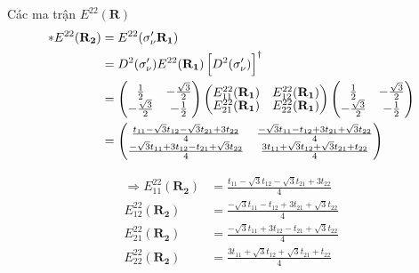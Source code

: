 \documentclass{report}
\begin{document}
Các ma trận $E^{22}(\mathbf{R})$
\begin{align*}
	\ast E^{22} (\mathbf{R_2})
	 & =  E^{22} (\sigma'_\nu \mathbf{R_1})                                             \\
	 & = D^2(\sigma'_\nu)  E^{22}(\mathbf{R_1}) \left[ D^2(\sigma'_\nu) \right]^\dagger \\
	 &
	=
	\begin{pmatrix}
		\renewcommand{\arraystretch}{0.72}
		\frac{1}{2}         & -\frac{\sqrt{3}}{2} \\
		-\frac{\sqrt{3}}{2} & -\frac{1}{2}
	\end{pmatrix}
	\begin{pmatrix}
		E_{11}^{22}(\mathbf{R_1}) & E_{12}^{22}(\mathbf{R_1}) \\
		E_{21}^{22}(\mathbf{R_1}) & E_{22}^{22}(\mathbf{R_1})
	\end{pmatrix}
	\begin{pmatrix}
		\frac{1}{2}         & -\frac{\sqrt{3}}{2} \\
		-\frac{\sqrt{3}}{2} & -\frac{1}{2}
	\end{pmatrix}                            \\
	 & =
	\begin{pmatrix}
		\frac{t_{11} - \sqrt{3}t_{12} - \sqrt{3}t_{21} + 3t_{22}}{4}  & \frac{-\sqrt{3}t_{11} - t_{12} + 3t_{21} + \sqrt{3}t_{22}}{4} \\
		\frac{-\sqrt{3}t_{11} + 3t_{12} - t_{21} + \sqrt{3}t_{22}}{4} & \frac{3t_{11} + \sqrt{3}t_{12} + \sqrt{3}t_{21} + t_{22}}{4}
	\end{pmatrix}
\end{align*}

\begin{align*}
	\Rightarrow E_{11}^{22}(\mathbf{R_2}) & = \frac{t_{11} - \sqrt{3}t_{12} - \sqrt{3}t_{21} + 3t_{22}}{4}  \\
	E_{12}^{22}(\mathbf{R_2})             & = \frac{-\sqrt{3}t_{11} - t_{12} + 3t_{21} + \sqrt{3}t_{22}}{4} \\
	E_{21}^{22}(\mathbf{R_2})             & = \frac{-\sqrt{3}t_{11} + 3t_{12} - t_{21} + \sqrt{3}t_{22}}{4} \\
	E_{22}^{22}(\mathbf{R_2})             & = \frac{3t_{11} + \sqrt{3}t_{12} + \sqrt{3}t_{21} + t_{22}}{4}  \\
\end{align*}
\end{document}
